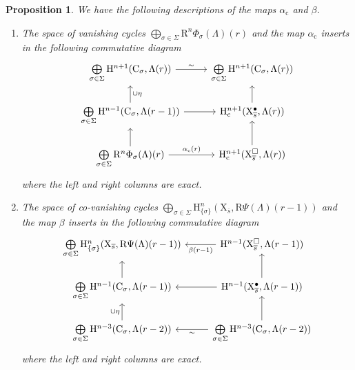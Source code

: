 \documentclass[10pt,a4paper]{amsart}
\newtheorem{proposition}{Proposition}
\def\rmC{\mathrm{C}}
\def\rmH{\mathrm{H}}
\def\rmR{\mathrm{R}}
\def\rmX{\mathrm{X}}
\def\rmc{\mathrm{c}}
\begin{document}
\begin{proposition}\label{alpha-beta}
We have the following descriptions of the maps $\alpha_{\rmc}$ and $\beta$.
\begin{enumerate}
\item The space of vanishing cycles  $\bigoplus\limits_{\sigma\in\Sigma}\rmR^{n}\Phi_{\sigma}(\Lambda)(r)$ and the map $\alpha_{\rmc}$ inserts in the following commutative diagram 
\begin{equation*}
\begin{tikzcd}
\bigoplus\limits_{\sigma\in\Sigma}\rmH^{n+1}(\rmC_{\sigma}, \Lambda(r)) \arrow[r, "\sim"]                 &       \bigoplus\limits_{\sigma\in\Sigma}\rmH^{n+1}(\rmC_{\sigma}, \Lambda(r))  \\
\bigoplus\limits_{\sigma\in\Sigma}\rmH^{n-1}(\rmC_{\sigma}, \Lambda(r-1)) \arrow[r] \arrow[u, "\cup \eta"'] & \rmH^{n+1}_{\rmc}({\rmX}^{\bullet}_{\overline{s}}, \Lambda(r)) \arrow[u] \\
\bigoplus\limits_{\sigma\in\Sigma}\rmR^{n}\Phi_{\sigma}(\Lambda)(r) \arrow[r, "\alpha_{\rmc}(r)"] \arrow[u]       & \rmH^{n+1}_{\rmc}(\rmX^{\square}_{\overline{s}}, \Lambda(r)) \arrow[u]
\end{tikzcd}
\end{equation*}
where the left and right columns are exact.
\item The space of co-vanishing cycles   $\bigoplus\limits_{\sigma\in\Sigma}\rmH^{n}_{\{\sigma\}}(\rmX_{\overline{s}}, \rmR\Psi(\Lambda)(r-1))$ and the map $\beta$ inserts in the following commutative diagram 
\begin{equation*}
\begin{tikzcd}
\bigoplus\limits_{\sigma\in\Sigma}\rmH^{n}_{\{\sigma\}}(\rmX_{\overline{s}}, \rmR\Psi(\Lambda)(r-1))              &\mathrm{H}^{n-1}(\rmX^{\square}_{\overline{s}}, \Lambda(r-1))\arrow[l, "\beta(r-1)"]           \\
\bigoplus\limits_{\sigma\in\Sigma}\rmH^{n-1}(\rmC_{\sigma}, \Lambda(r-1)) \arrow[u] &   \mathrm{H}^{n-1}({\rmX}^{\bullet}_{\overline{s}}, \Lambda(r-1)) \arrow[l] \arrow[u] \\
\bigoplus\limits_{\sigma\in\Sigma}\rmH^{n-3}(\rmC_{\sigma}, \Lambda(r-2)) \arrow[u, "\cup\eta"]       &  \bigoplus\limits_{\sigma\in\Sigma}\rmH^{n-3}(\rmC_{\sigma}, \Lambda(r-2))\arrow[l,"\sim"] \arrow[u]
\end{tikzcd}
\end{equation*}
where the left and right columns are exact.
\end{enumerate}
\end{proposition}
\end{document}
